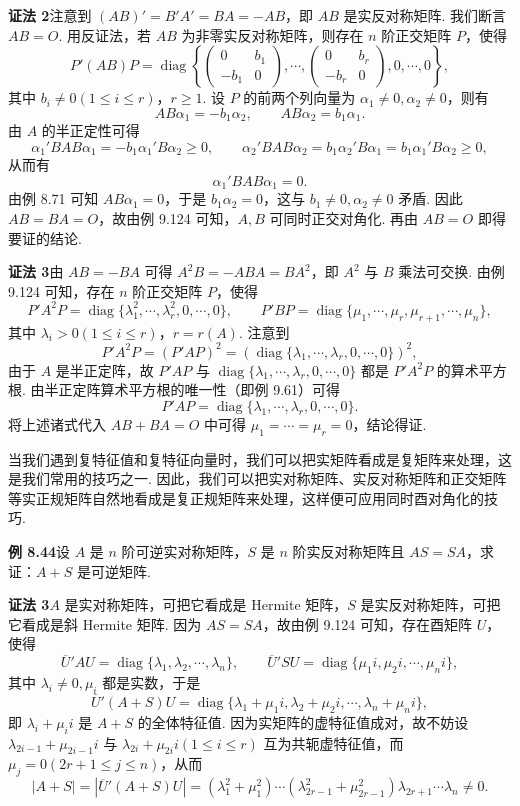 \documentclass[UTF8, 12pt, fontset=fandol, oneside]{ctexart}
\begin{document}
\noindent\textbf{证法 2}\quad 注意到 $(AB)'=B'A'=BA=-AB$，即 $AB$ 是实反对称矩阵. 我们断言 $AB=O$. 用反证法，若 $AB$ 为非零实反对称矩阵，则存在 $n$ 阶正交矩阵 $P$，使得
\[
P'(AB)P=\operatorname{diag}\left\{
\begin{pmatrix}
0&b_1\\
-b_1&0
\end{pmatrix},\cdots,
\begin{pmatrix}
0&b_r\\
-b_r&0
\end{pmatrix},
0,\cdots,0
\right\},
\]
其中 $b_i\ne0(1\le i\le r)$，$r\ge1$. 设 $P$ 的前两个列向量为 $\alpha_1\ne0,\alpha_2\ne0$，则有
\[
AB\alpha_1=-b_1\alpha_2,\qquad AB\alpha_2=b_1\alpha_1.
\]
由 $A$ 的半正定性可得
\[
\alpha_1'BAB\alpha_1=-b_1\alpha_1'B\alpha_2\ge0,\qquad
\alpha_2'BAB\alpha_2=b_1\alpha_2'B\alpha_1=b_1\alpha_1'B\alpha_2\ge0,
\]
从而有
\[
\alpha_1'BAB\alpha_1=0.
\]
由例 8.71 可知 $AB\alpha_1=0$，于是 $b_1\alpha_2=0$，这与 $b_1\ne0,\alpha_2\ne0$ 矛盾. 因此 $AB=BA=O$，故由例 9.124 可知，$A,B$ 可同时正交对角化. 再由 $AB=O$ 即得要证的结论.

\noindent\textbf{证法 3}\quad 由 $AB=-BA$ 可得 $A^2B=-ABA=BA^2$，即 $A^2$ 与 $B$ 乘法可交换. 由例 9.124 可知，存在 $n$ 阶正交矩阵 $P$，使得
\[
P'A^2P=\operatorname{diag}\{\lambda_1^2,\cdots,\lambda_r^2,0,\cdots,0\},\qquad
P'BP=\operatorname{diag}\{\mu_1,\cdots,\mu_r,\mu_{r+1},\cdots,\mu_n\},
\]
其中 $\lambda_i>0(1\le i\le r)$，$r=r(A)$. 注意到
\[
P'A^2P=(P'AP)^2=(\operatorname{diag}\{\lambda_1,\cdots,\lambda_r,0,\cdots,0\})^2,
\]
由于 $A$ 是半正定阵，故 $P'AP$ 与 $\operatorname{diag}\{\lambda_1,\cdots,\lambda_r,0,\cdots,0\}$ 都是 $P'A^2P$ 的算术平方根. 由半正定阵算术平方根的唯一性（即例 9.61）可得
\[
P'AP=\operatorname{diag}\{\lambda_1,\cdots,\lambda_r,0,\cdots,0\}.
\]
将上述诸式代入 $AB+BA=O$ 中可得 $\mu_1=\cdots=\mu_r=0$，结论得证.

当我们遇到复特征值和复特征向量时，我们可以把实矩阵看成是复矩阵来处理，这是我们常用的技巧之一. 因此，我们可以把实对称矩阵、实反对称矩阵和正交矩阵等实正规矩阵自然地看成是复正规矩阵来处理，这样便可应用同时酉对角化的技巧.

\noindent\textbf{例 8.44}\quad 设 $A$ 是 $n$ 阶可逆实对称矩阵，$S$ 是 $n$ 阶实反对称矩阵且 $AS=SA$，求证：$A+S$ 是可逆矩阵.

\noindent\textbf{证法 3}\quad $A$ 是实对称矩阵，可把它看成是 Hermite 矩阵，$S$ 是实反对称矩阵，可把它看成是斜 Hermite 矩阵. 因为 $AS=SA$，故由例 9.124 可知，存在酉矩阵 $U$，使得
\[
\overline{U}'AU=\operatorname{diag}\{\lambda_1,\lambda_2,\cdots,\lambda_n\},\qquad
\overline{U}'SU=\operatorname{diag}\{\mu_1i,\mu_2i,\cdots,\mu_ni\},
\]
其中 $\lambda_i\ne0,\mu_i$ 都是实数，于是
\[
\overline{U}'(A+S)U=\operatorname{diag}\{\lambda_1+\mu_1i,\lambda_2+\mu_2i,\cdots,\lambda_n+\mu_ni\},
\]
即 $\lambda_i+\mu_ii$ 是 $A+S$ 的全体特征值. 因为实矩阵的虚特征值成对，故不妨设 $\lambda_{2i-1}+\mu_{2i-1}i$ 与 $\lambda_{2i}+\mu_{2i}i(1\le i\le r)$ 互为共轭虚特征值，而 $\mu_j=0(2r+1\le j\le n)$，从而
\[
|A+S|=|\overline{U}'(A+S)U|=(\lambda_1^2+\mu_1^2)\cdots(\lambda_{2r-1}^2+\mu_{2r-1}^2)\lambda_{2r+1}\cdots\lambda_n\ne0.
\]
\end{document}
